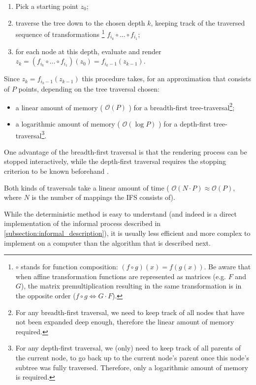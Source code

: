 \documentclass[11pt]{article}
\begin{document}
\begin{enumerate}
\item Pick a starting point \(z_0\);
\item traverse the tree down to the chosen depth \(k\), keeping track of the traversed sequence of transformations \footnote{\(\circ\) stands for function composition: \((f \circ g)(x) = f(g(x))\). 
Be aware that when affine transformation functions are represented as matrices (e.g. \(F\) and \(G\)), 
the matrix premultiplication resulting in the same transformation is in the opposite order (\(f \circ g \Leftrightarrow G \cdot F\)).} \(f_{i_k} \circ \ldots \circ f_{i_1}\);
\item for each node at this depth, evaluate and render \(z_k = (f_{i_k} \circ \ldots \circ f_{i_1})(z_0) = f_{i_k-1}(z_{k-1})\).
\end{enumerate}

Since \(z_{k} = f_{i_k-1}(z_{k-1})\) this procedure takes, for an approximation that consists of \(P\) points, depending on the tree traversal chosen:

\begin{itemize}
\item a linear amount of memory ( \(\mathcal{O}(P)\) ) for a breadth-first tree-traversal\footnote{For any breadth-first traversal, we need to keep track of all nodes that have not been expanded deep enough, therefore the linear amount of memory required.};
\item a logarithmic amount of memory ( \(\mathcal{O}(\log{P})\) ) for a depth-first tree-traversal\footnote{For any depth-first traversal, we (only) need to keep track of all parents of the current node, to go back up to the current node's parent once this node's subtree was fully traversed. Therefore, only a logarithmic amount of memory is required.}.
\end{itemize}

One advantage of the breadth-first traversal is that the rendering process can be stopped interactively,
while the depth-first traversal requires the stopping criterion to be known beforehand \cite{hepting1991rendering}.

Both kinds of traversals take a linear amount of time ( \(\mathcal{O}(N \cdot P) \approx \mathcal{O}(P)\), where \(N\) is the number of mappings the IFS consists of).

While the deterministic method is easy to understand (and indeed is a direct implementation of the informal process described in \autoref{subsection:informal_description}),
it is usually less efficient and more complex to implement on a computer than the algorithm that is described next.
\end{document}
